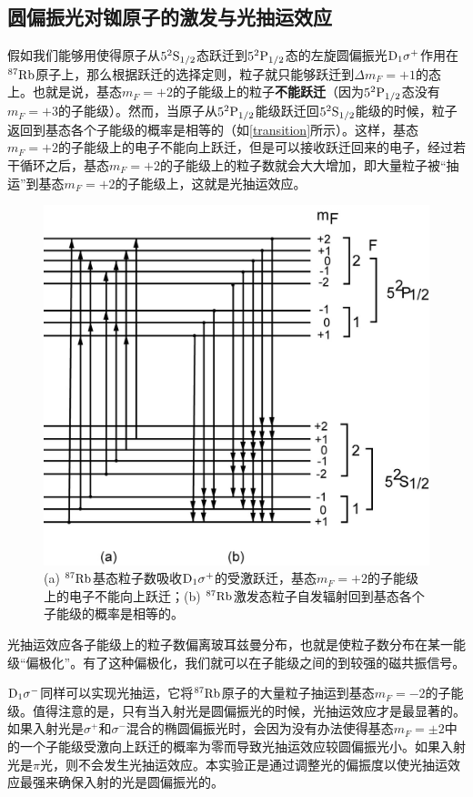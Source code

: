 \documentclass[font=default]{mpltx}
\begin{document}
\subsection{圆偏振光对铷原子的激发与光抽运效应}
假如我们能够用使得原子从${\rm 5^2S_{1/2}}$态跃迁到${\rm 5^2P_{1/2}}$态的左旋圆偏振光${\rm D_1\sigma^+}$作用在${\rm ^{87}Rb}$原子上，那么根据跃迁的选择定则，粒子就只能够跃迁到$\Delta m_F=+1$的态上。也就是说，基态$m_F=+2$的子能级上的粒子\textbf{不能跃迁}（因为${\rm 5^2P_{1/2}}$态没有$m_F=+3$的子能级）。然而，当原子从${\rm 5^2P_{1/2}}$能级跃迁回${\rm 5^2S_{1/2}}$能级的时候，粒子返回到基态各个子能级的概率是相等的（如\autoref{transition}所示）。这样，基态$m_F=+2$的子能级上的电子不能向上跃迁，但是可以接收跃迁回来的电子，经过若干循环之后，基态$m_F=+2$的子能级上的粒子数就会大大增加，即大量粒子被“抽运”到基态$m_F=+2$的子能级上，这就是光抽运效应。
\begin{figure}
  \centering
  \includegraphics[width=0.6\linewidth]{fig/transition.png}
  \caption{(a) ${\rm ^{87}Rb}$基态粒子数吸收${\rm D_1\sigma^+}$的受激跃迁，基态$m_F=+2$的子能级上的电子不能向上跃迁；(b) ${\rm ^{87}Rb}$激发态粒子自发辐射回到基态各个子能级的概率是相等的。}
  \label{transition}
\end{figure}

光抽运效应各子能级上的粒子数偏离玻耳兹曼分布，也就是使粒子数分布在某一能级“偏极化”。有了这种偏极化，我们就可以在子能级之间的到较强的磁共振信号。

${\rm D_1\sigma^-}$同样可以实现光抽运，它将${\rm ^{87}Rb}$原子的大量粒子抽运到基态$m_F=-2$的子能级。值得注意的是，只有当入射光是圆偏振光的时候，光抽运效应才是最显著的。如果入射光是$\sigma^+$和$\sigma^-$混合的椭圆偏振光时，会因为没有办法使得基态$m_F=\pm2$中的一个子能级受激向上跃迁的概率为零而导致光抽运效应较圆偏振光小。如果入射光是$\pi$光，则不会发生光抽运效应。本实验正是通过调整光的偏振度以使光抽运效应最强来确保入射的光是圆偏振光的。
\end{document}
